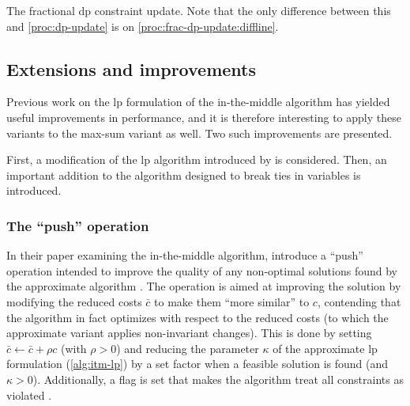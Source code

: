 \begin{algorithm}[tbp]
	
	\caption{
		The fractional \gls{dp} constraint update. Note that the only difference between this and \cref{proc:dp-update} is on \cref{proc:frac-dp-update:diffline}.
	}
	\label{proc:frac-dp-update}
\end{algorithm}

\subsection{Extensions and improvements}
Previous work on the \gls{lp} formulation of the in-the-middle algorithm has yielded useful improvements in performance, and it is therefore interesting to apply these variants to the max-sum variant as well.
Two such improvements are presented.

First, a modification of the \gls{lp} algorithm introduced by \textcite{Bastert10} is considered.
Then, an important addition to the algorithm designed to break ties in variables is introduced.

\subsubsection{The \enquote{push} operation}
In their paper examining the in-the-middle algorithm, \textcite{Bastert10} introduce a \enquote{push} operation intended to improve the quality of any non-optimal solutions found by the approximate algorithm \parencite[\pno~99\psq]{Bastert10}.
The operation is aimed at improving the solution by modifying the reduced costs \(\bar{c}\) to make them \enquote{more similar} to \(c\), contending that the algorithm in fact optimizes with respect to the reduced costs (to which the approximate variant applies non-invariant changes).
This is done by setting \(\bar{c}\leftarrow\bar{c}+\rho c\) (with \(\rho>0\)) and reducing the parameter \(\kappa\) of the approximate \gls{lp} formulation (\cref{alg:itm-lp}) by a set factor when a feasible solution is found (and \(\kappa>0\)).
Additionally, a flag is set that makes the algorithm treat all constraints as violated \parencite[\pno~100]{Bastert10}.

